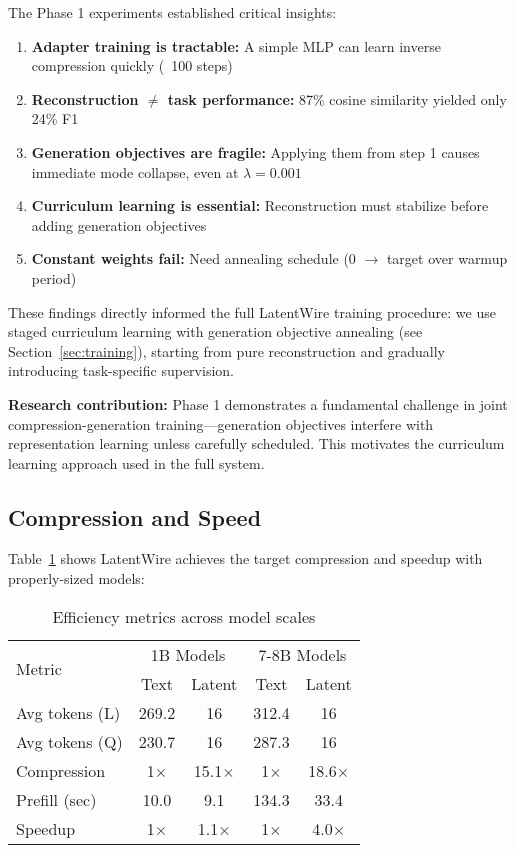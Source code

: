 \documentclass{article}
\begin{document}
The Phase 1 experiments established critical insights:

\begin{enumerate}
\item \textbf{Adapter training is tractable:} A simple MLP can learn inverse compression quickly (~100 steps)
\item \textbf{Reconstruction $\neq$ task performance:} 87\% cosine similarity yielded only 24\% F1
\item \textbf{Generation objectives are fragile:} Applying them from step 1 causes immediate mode collapse, even at $\lambda=0.001$
\item \textbf{Curriculum learning is essential:} Reconstruction must stabilize before adding generation objectives
\item \textbf{Constant weights fail:} Need annealing schedule (0 $\rightarrow$ target over warmup period)
\end{enumerate}

These findings directly informed the full LatentWire training procedure: we use staged curriculum learning with generation objective annealing (see Section~\ref{sec:training}), starting from pure reconstruction and gradually introducing task-specific supervision.

\textbf{Research contribution:} Phase 1 demonstrates a fundamental challenge in joint compression-generation training—generation objectives interfere with representation learning unless carefully scheduled. This motivates the curriculum learning approach used in the full system.

\subsection{Compression and Speed}

Table~\ref{tab:efficiency_full} shows LatentWire achieves the target compression and speedup with properly-sized models:

\begin{table}[h]
\caption{Efficiency metrics across model scales}
\label{tab:efficiency_full}
\vskip 0.15in
\begin{center}
\begin{small}
\begin{tabular}{lcccc}
\toprule
\multirow{2}{*}{Metric} & \multicolumn{2}{c}{1B Models} & \multicolumn{2}{c}{7-8B Models} \\
& Text & Latent & Text & Latent \\
\midrule
Avg tokens (L) & 269.2 & 16 & 312.4 & 16 \\
Avg tokens (Q) & 230.7 & 16 & 287.3 & 16 \\
Compression & 1$\times$ & 15.1$\times$ & 1$\times$ & 18.6$\times$ \\
Prefill (sec) & 10.0 & 9.1 & 134.3 & 33.4 \\
Speedup & 1$\times$ & 1.1$\times$ & 1$\times$ & 4.0$\times$ \\
\bottomrule
\end{tabular}
\end{small}
\end{center}
\vskip -0.1in
\end{table}
\end{document}
